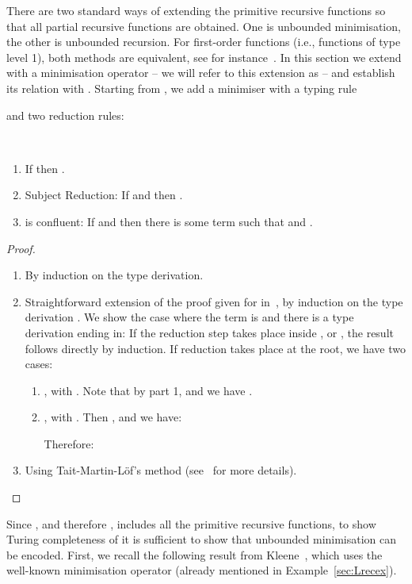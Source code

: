 \documentclass{article}
\begin{document}
There are two standard ways of extending the primitive recursive
functions so that all partial recursive functions are obtained. One is
unbounded minimisation, the other is unbounded recursion. For first-order
functions (i.e., functions of type level 1), both methods are
equivalent, see for instance~\cite{BergerU}.  
In this section we extend \LLCI with a minimisation operator -- we will refer to this extension as \LLCIm -- and establish its relation with \LLCIrec.
Starting from  \LLCI,  we add a minimiser with a typing rule

and two reduction rules:



\begin{theorem}\ 
\begin{enumerate}
\item
If  then .
\item
Subject Reduction: If  and  then .
\item
\LLCIm is confluent: If  and  then there is some term  such that  and .
\end{enumerate}
\end{theorem}
\begin{proof}\ 
\begin{enumerate}
\item
By induction on the type derivation.
\item
Straightforward extension of the proof given for \LLCI in~\cite{AlvesS:TCS}, by induction on the type derivation . We show the case where the term  is  and there is a type derivation ending in:
{\small
}
If the reduction step takes place inside ,  or , the result follows directly by induction. If reduction takes place at the root, we have two cases:
\begin{enumerate}
\item , with . Note that  by part 1, and we have .  
\item , with . Then  , and we have:
{\small

}
Therefore:
{\small

}
\end{enumerate}
\item Using Tait-Martin-L\"of's method (see~\cite{BarendregtHP:lamcss} for more details).
\end{enumerate}
\end{proof}

Since \LLCI, and therefore \LLCIm, includes all the primitive recursive
functions, to show Turing completeness of \LLCIm it is sufficient to
show that unbounded minimisation can be encoded.  First, we recall the
following result from Kleene~\cite{klee:intr52}, which uses the well-known
minimisation operator  (already mentioned in Example~\ref{sec:Lrecex}).
\end{document}
